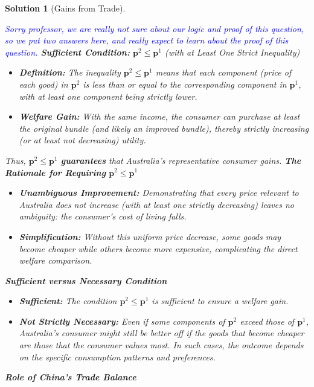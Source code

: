 \documentclass[a4paper,12pt]{article} %
\theoremstyle{nonitalic}
\newtheorem{solution}{Solution}
\begin{document}
\begin{solution}[Gains from Trade]
    \

    \textcolor{blue}{Sorry professor, we are really not sure about our logic and proof of this question, so we put two answers here, and really expect to learn about the proof of this question.}
    \textbf{Sufficient Condition:} $\mathbf{p}^2 \le \mathbf{p}^1$ (with at Least One Strict Inequality)
    \begin{itemize}
        \item \textbf{Definition:} The inequality $\mathbf{p}^2 \le \mathbf{p}^1$ means that each component (price of each good) in $\mathbf{p}^2$ is less than or equal to the corresponding component in $\mathbf{p}^1$, with at least one component being strictly lower.
        \item \textbf{Welfare Gain:} With the same income, the consumer can purchase at least the original bundle (and likely an improved bundle), thereby strictly increasing (or at least not decreasing) utility.
    \end{itemize}
    Thus, $\mathbf{p}^2 \le \mathbf{p}^1$ \textbf{guarantees} that Australia's representative consumer gains.
    \textbf{The Rationale for Requiring} $\mathbf{p}^2 \le \mathbf{p}^1$
    \begin{itemize}
        \item \textbf{Unambiguous Improvement:} Demonstrating that every price relevant to Australia does not increase (with at least one strictly decreasing) leaves no ambiguity: the consumer’s cost of living falls.
        \item \textbf{Simplification:} Without this uniform price decrease, some goods may become cheaper while others become more expensive, complicating the direct welfare comparison.
    \end{itemize}
    \textbf{Sufficient versus Necessary Condition}
    \begin{itemize}
        \item \textbf{Sufficient:} The condition $\mathbf{p}^2 \le \mathbf{p}^1$ is sufficient to ensure a welfare gain.
        \item \textbf{Not Strictly Necessary:} Even if some components of $\mathbf{p}^2$ exceed those of $\mathbf{p}^1$, Australia’s consumer might still be better off if the goods that become cheaper are those that the consumer values most. In such cases, the outcome depends on the specific consumption patterns and preferences.
    \end{itemize}
    \textbf{Role of China's Trade Balance}

\end{solution}
\end{document}
